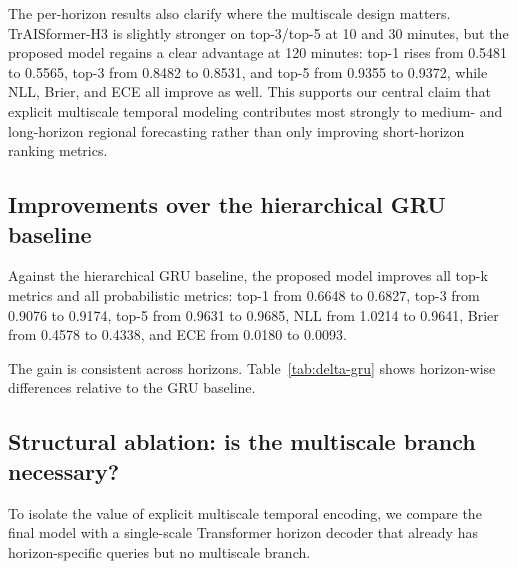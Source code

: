 The per-horizon results also clarify where the multiscale design matters. TrAISformer-H3 is slightly stronger on top-3/top-5 at 10 and 30 minutes, but the proposed model regains a clear advantage at 120 minutes: top-1 rises from 0.5481 to 0.5565, top-3 from 0.8482 to 0.8531, and top-5 from 0.9355 to 0.9372, while NLL, Brier, and ECE all improve as well. This supports our central claim that explicit multiscale temporal modeling contributes most strongly to medium- and long-horizon regional forecasting rather than only improving short-horizon ranking metrics.

\subsection{Improvements over the hierarchical GRU baseline}

Against the hierarchical GRU baseline, the proposed model improves all top-k metrics and all probabilistic metrics: top-1 from 0.6648 to 0.6827, top-3 from 0.9076 to 0.9174, top-5 from 0.9631 to 0.9685, NLL from 1.0214 to 0.9641, Brier from 0.4578 to 0.4338, and ECE from 0.0180 to 0.0093.

The gain is consistent across horizons. Table~\ref{tab:delta-gru} shows horizon-wise differences relative to the GRU baseline.

\begin{table}[t]
\centering
\small
\resizebox{\columnwidth}{!}{%

}
\caption{Per-horizon delta of the proposed model relative to the hierarchical GRU baseline. Positive is better for top-k and union cover; negative is better for NLL, Brier, ECE, candidate cells, and candidate area.}
\label{tab:delta-gru}
\end{table}

\subsection{Structural ablation: is the multiscale branch necessary?}

To isolate the value of explicit multiscale temporal encoding, we compare the final model with a single-scale Transformer horizon decoder that already has horizon-specific queries but no multiscale branch.

\begin{table}[t]
\centering
\small
\resizebox{\columnwidth}{!}{%

}
\caption{Structural ablation comparing the single-scale Transformer horizon decoder with the proposed multiscale model.}
\label{tab:structural-ablation}
\end{table}

